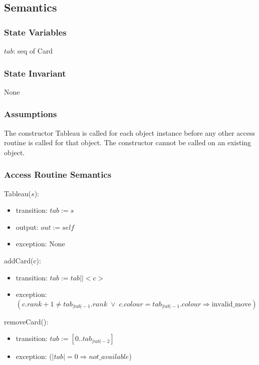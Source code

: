 \documentclass[12pt]{article}
\begin{document}
\subsection* {Semantics}

\subsubsection* {State Variables}

$tab$: seq of Card\\

\subsubsection* {State Invariant}

None

\subsubsection* {Assumptions}

The constructor Tableau is called for each object instance before any other
access routine is called for that object.  The constructor cannot be called on
an existing object.

\subsubsection* {Access Routine Semantics}

Tableau($s$):
\begin{itemize}
\item transition: $tab := s$
\item output: $out := \mathit{self}$
\item exception: None
\end{itemize}

\noindent addCard(c):
\begin{itemize}
\item transition: $tab := tab || < c > $
\item exception: $(c.rank + 1 \neq tab_{|tab| - 1}.rank \;\lor\; c.colour = tab_{|tab| - 1}.colour \Rightarrow \mbox{invalid\_move}) $\\ 
\end{itemize}

\noindent removeCard():
\begin{itemize}
\item transition: $tab := [0 .. tab_{|tab|-2}] $
\item exception: ($|tab| = 0 \Rightarrow not\_available$)
\end{itemize}
\end{document}
